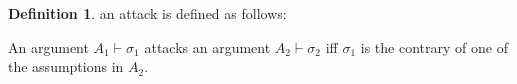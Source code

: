 \documentclass[pdftex,12pt,a4paper]{article}
\theoremstyle{definition}
\newtheorem{defn}{Definition}
\theoremstyle{definition}
\begin{document}
\begin{defn} an attack is defined as follows:
\newline

An argument $A_1 \vdash \sigma_1$ attacks an argument $A_2 \vdash \sigma_2$ iff $\sigma_1$ is the contrary of one of the assumptions in $A_2$.

\end{defn}
\end{document}
